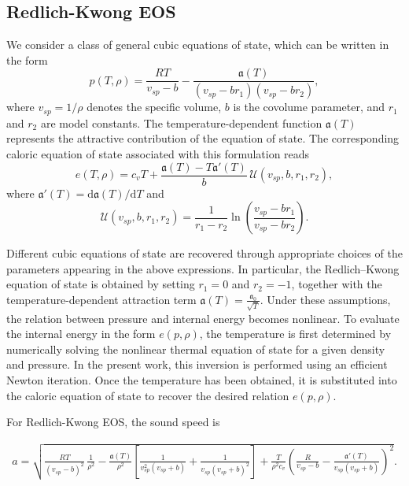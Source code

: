 \documentclass[a4paper,fleqn]{cas-sc}
\theoremstyle{definition}
\theoremstyle{remark}
\begin{document}
\subsection{Redlich-Kwong EOS}
\label{sec:redlich-kwong eos}
We consider a class of general cubic equations of state, which can be written
in the form
\begin{equation}
p(T,\rho) = \frac{RT}{v_{sp}-b}
- \frac{\mathfrak{a}(T)}{(v_{sp} - b r_1)(v_{sp} - b r_2)},
\end{equation}
where $v_{sp} = 1/\rho$ denotes the specific volume, $b$ is the covolume parameter,
and $r_1$ and $r_2$ are model constants. The temperature-dependent function
$\mathfrak{a}(T)$ represents the attractive contribution of the equation of state.
The corresponding caloric equation of state associated with this formulation
reads
\begin{equation}
e(T,\rho) = c_v T
+ \frac{\mathfrak{a}(T) - T \mathfrak{a}'(T)}{b}\, \mathcal{U}(v_{sp},b,r_1,r_2),
\end{equation}
where $\mathfrak{a}'(T) = \mathrm{d}\mathfrak{a}(T)/\mathrm{d}T$ and
\begin{equation}
\mathcal{U}(v_{sp},b,r_1,r_2)
= \frac{1}{r_1 - r_2}
\ln\!\left(\frac{v_{sp} - b r_1}{v_{sp} - b r_2}\right).
\end{equation}

Different cubic equations of state are recovered through appropriate choices
of the parameters appearing in the above expressions. In particular, the
Redlich--Kwong equation of state is obtained by setting $r_1 = 0$ and
$r_2 = -1$, together with the temperature-dependent attraction term
$\mathfrak{a}(T) = \frac{\mathfrak{a}_0}{\sqrt{T}}$. Under these assumptions, the relation between pressure
and internal energy becomes nonlinear. To evaluate the internal energy in the
form $e(p,\rho)$, the temperature is first determined by numerically solving
the nonlinear thermal equation of state for a given density and pressure.
In the present work, this inversion is performed using an efficient Newton
iteration. Once the temperature has been obtained, it is substituted into the
caloric equation of state to recover the desired relation $e(p,\rho)$.

For Redlich-Kwong EOS, the sound speed is

\begin{equation}
\begin{aligned}
a= \sqrt{
\frac{RT}{(v_{sp}-b)^2}\,\frac{1}{\rho^2}
-
\frac{\mathfrak{a}(T)}{\rho^2}
\left[
\frac{1}{v_{sp}^2(v_{sp}+b)}
+
\frac{1}{v_{sp}(v_{sp}+b)^2}
\right]
+
\frac{T}{\rho^2 c_v}
\left(
\frac{R}{v_{sp}-b}
-
\frac{\mathfrak{a}'(T)}{v_{sp}(v_{sp}+b)}
\right)^2}.
\end{aligned}
\end{equation}
\end{document}
